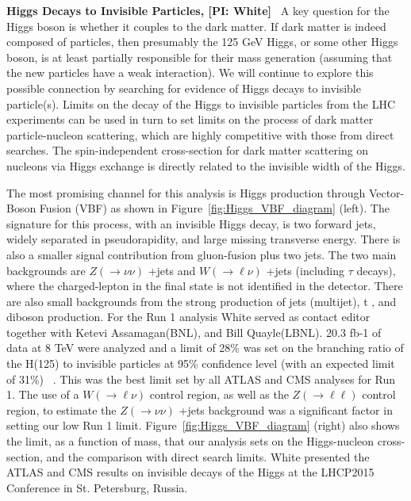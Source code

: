 \textbf{Higgs Decays to Invisible Particles, [PI: White]} \
A key question for the Higgs boson is whether it couples to the dark matter. 
If dark matter is indeed composed of particles, then presumably the 
125 GeV Higgs, or some other Higgs boson, is at least partially responsible 
for their mass generation (assuming that the new particles have a weak interaction).
We will continue to explore this possible connection by 
searching for evidence of Higgs decays to invisible particle(s).
Limits on the decay of the Higgs to invisible particles from the LHC experiments can be used in turn to set limits
on the process of dark matter particle-nucleon scattering, which are highly competitive with those from direct searches. 
The spin-independent cross-section for dark matter scattering on nucleons via Higgs exchange is directly related to the
invisible width of the Higgs.


The most promising channel for this analysis is Higgs production through Vector-Boson Fusion (VBF) 
as shown in Figure~\ref{fig:Higgs_VBF_diagram} (left). The signature for this process, with an invisible Higgs decay, 
is two forward jets, widely separated in pseudorapidity, and large missing transverse energy.
There is also a smaller signal contribution from gluon-fusion plus two jets.
The two main backgrounds are  $Z (\rightarrow \nu\nu)$ +jets and $W (\rightarrow \ell\nu) $ +jets (including $ \tau $ decays), 
where the charged-lepton in the final state is not identified in the detector. There are also
small backgrounds from the strong production of jets (multijet), t \tbar, and diboson production.
For the Run 1 analysis White served as contact editor together with Ketevi Assamagan(BNL), and Bill Quayle(LBNL). 
20.3 fb-1 of data at 8 TeV were analyzed and a limit of 28\% was set on the branching ratio of the H(125) to
 invisible particles at 95\% confidence level (with an expected limit of 31\%) ~\cite{HinvRun1}. This was the best limit set 
by all ATLAS and CMS analyses for Run 1. The use of a $W(\rightarrow \ell\nu) $ control region, as well as the
$Z (\rightarrow \ell\ell) $ control region, to estimate the $Z (\rightarrow \nu\nu) $ +jets background was a 
significant factor in setting our low Run 1 limit. Figure~\ref{fig:Higgs_VBF_diagram} (right) also shows the limit, as a function of mass, 
that our analysis sets on the Higgs-nucleon cross-section, and the comparison with direct search limits. 
White presented the ATLAS and CMS results on invisible decays of the Higgs at the LHCP2015 Conference in St. Petersburg, Russia. ~\cite{LHCP2015}

